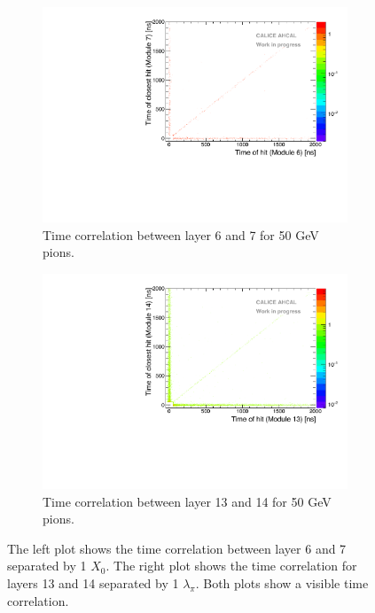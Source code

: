 \begin{figure}[htbp!]
	\begin{subfigure}[t]{0.5\textwidth}
		\centering
		\includegraphics[width=1\textwidth]{chap5/fig_AHCAL_timing/Pions/Time_Correlation_short.pdf}
		\caption{Time correlation between layer 6 and 7 for 50 GeV pions.} \label{fig:Time_Corr_short}
	\end{subfigure}
	\hfill
	\begin{subfigure}[t]{0.5\textwidth}
		\centering
		\includegraphics[width=1\textwidth]{chap5/fig_AHCAL_timing/Pions/Time_Correlation_long.pdf}
		\caption{Time correlation between layer 13 and 14 for 50 GeV pions.}\label{fig:Time_Corr_long}
	\end{subfigure}
	\caption{The left plot shows the time correlation between layer 6 and 7 separated by 1 $X_0$. The right plot shows the time correlation for layers 13 and 14 separated by 1 $\lambda_{\pi}$. Both plots show a visible time correlation.}
	\label{fig:TimeCorrelation}
\end{figure}

